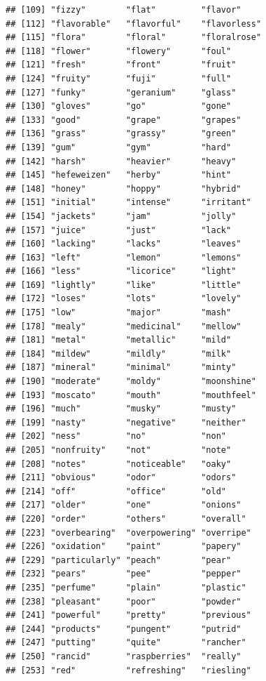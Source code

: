 \documentclass[
]{krantz}
\begin{document}
\begin{verbatim}
## [109] "fizzy"        "flat"         "flavor"      
## [112] "flavorable"   "flavorful"    "flavorless"  
## [115] "flora"        "floral"       "floralrose"  
## [118] "flower"       "flowery"      "foul"        
## [121] "fresh"        "front"        "fruit"       
## [124] "fruity"       "fuji"         "full"        
## [127] "funky"        "geranium"     "glass"       
## [130] "gloves"       "go"           "gone"        
## [133] "good"         "grape"        "grapes"      
## [136] "grass"        "grassy"       "green"       
## [139] "gum"          "gym"          "hard"        
## [142] "harsh"        "heavier"      "heavy"       
## [145] "hefeweizen"   "herby"        "hint"        
## [148] "honey"        "hoppy"        "hybrid"      
## [151] "initial"      "intense"      "irritant"    
## [154] "jackets"      "jam"          "jolly"       
## [157] "juice"        "just"         "lack"        
## [160] "lacking"      "lacks"        "leaves"      
## [163] "left"         "lemon"        "lemons"      
## [166] "less"         "licorice"     "light"       
## [169] "lightly"      "like"         "little"      
## [172] "loses"        "lots"         "lovely"      
## [175] "low"          "major"        "mash"        
## [178] "mealy"        "medicinal"    "mellow"      
## [181] "metal"        "metallic"     "mild"        
## [184] "mildew"       "mildly"       "milk"        
## [187] "mineral"      "minimal"      "minty"       
## [190] "moderate"     "moldy"        "moonshine"   
## [193] "moscato"      "mouth"        "mouthfeel"   
## [196] "much"         "musky"        "musty"       
## [199] "nasty"        "negative"     "neither"     
## [202] "ness"         "no"           "non"         
## [205] "nonfruity"    "not"          "note"        
## [208] "notes"        "noticeable"   "oaky"        
## [211] "obvious"      "odor"         "odors"       
## [214] "off"          "office"       "old"         
## [217] "older"        "one"          "onions"      
## [220] "order"        "others"       "overall"     
## [223] "overbearing"  "overpowering" "overripe"    
## [226] "oxidation"    "paint"        "papery"      
## [229] "particularly" "peach"        "pear"        
## [232] "pears"        "pee"          "pepper"      
## [235] "perfume"      "plain"        "plastic"     
## [238] "pleasant"     "poor"         "powder"      
## [241] "powerful"     "pretty"       "previous"    
## [244] "products"     "pungent"      "putrid"      
## [247] "putting"      "quite"        "rancher"     
## [250] "rancid"       "raspberries"  "really"      
## [253] "red"          "refreshing"   "riesling"    

\end{verbatim}
\end{document}
